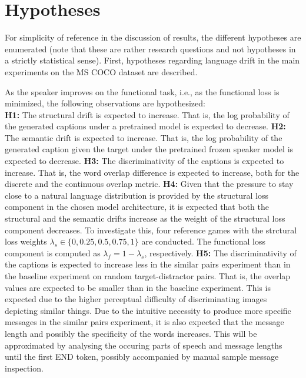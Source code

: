 \section{Hypotheses}

For simplicity of reference in the discussion of results, the different hypotheses are enumerated (note that these are rather research questions and not hypotheses in a strictly statistical sense).
First, hypotheses regarding language drift in the main experiments on the MS COCO dataset are described. 

As the speaker improves on the functional task, i.e., as the functional loss is minimized, the following observations are hypothesized: \\
\newline 
\textbf{H1:} The structural drift is expected to increase. That is, the log probability of the generated captions under a pretrained model is expected to decrease. \newline
\textbf{H2:} The semantic drift is expected to increase. That is, the log probability of the generated caption given the target under the pretrained frozen speaker model is expected to decrease. \newline
\textbf{H3:} The discriminativity of the captions is expected to increase. That is, the word overlap difference is expected to increase, both for the discrete and the continuous overlap metric. \newline
\textbf{H4:} Given that the pressure to stay close to a natural language distribution is provided by the structural loss component in the chosen model architecture, it is expected that both the structural and the semantic drifts increase as the weight of the structural loss component decreases. To investigate this, four reference games with the strctural loss weights $\lambda_s \in \{0, 0.25, 0.5, 0.75, 1\}$ are conducted. The functional loss component is computed as $\lambda_f = 1 - \lambda_s$, respectively. \newline
\textbf{H5:} The discriminativity of the captions is expected to increase less in the similar pairs experiment than in the baseline experiment on random target-distractor pairs. That is, the overlap values are expected to be smaller than in the baseline experiment. This is expected due to the higher perceptual difficulty of discriminating images depicting similar things. Due to the intuitive necessity to produce more specific messages in the similar pairs experiment, it is also expected that the message length and possibly the specificity of the words increases. This will be approximated by analysing the occuring parts of speech and message lengths until the first END token, possibly accompanied by manual sample message inspection.\newline

